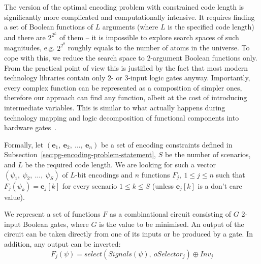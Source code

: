 The version of the optimal encoding problem with constrained code length
is significantly more complicated and computationally intensive. It
requires finding a set of Boolean functions of $L$ arguments (where
$L$ is the specified code length) and there are $2^{2^{L}}$ of them
-- it is impossible to explore search spaces of such magnitudes, e.g.
$2^{2^{8}}$ roughly equals to the number of atoms in the universe.
To cope with this, we reduce the search space to 2-argument Boolean
functions only. From the practical point of view this is justified
by the fact that most modern technology libraries contain only 2-
or 3-input logic gates anyway. Importantly, every complex function
can be represented as a composition of simpler ones, therefore our
approach can find any function, albeit at the cost of introducing
intermediate variables. This is similar to what actually happens during
technology mapping and logic decomposition of
functional components into hardware gates~\cite{2002_cortadella_book}\cite{1994_de_micheli_book}.

Formally, let $(\mathbf{e}_{1},\ \mathbf{e}_{2},\ \dots,\ \mathbf{e}_{n})$
be a set of encoding constraints defined in Subsection~\ref{sec:pg-encoding-problem-statement},
$S$ be the number of scenarios, and $L$ be the required code length.
We are looking for such a vector $(\psi_{1},\ \psi_{2},\ \dots,\ \psi_{S})$
of $L$-bit encodings and $n$ functions $F_{j},\ 1\le j\le n$ such
that $F_{j}(\psi_{k})=\mathbf{e}_{j}[k]$ for every scenario $1\le k\le S$
(unless $\mathbf{e}_{j}[k]$ is a don't care value).

We represent a set of functions $F$ as a combinational circuit consisting
of $G$ 2-input Boolean gates, where $G$ is the value to be minimised.
An output of the circuit can be taken directly from one of its inputs
or be produced by a gate. In addition, any output can be inverted:
\[
F_{j}(\psi)=\mathit{select}(Signals(\psi),\ \mathit{oSelector}_{j})\oplus\mathit{Inv}_{j}
\]


